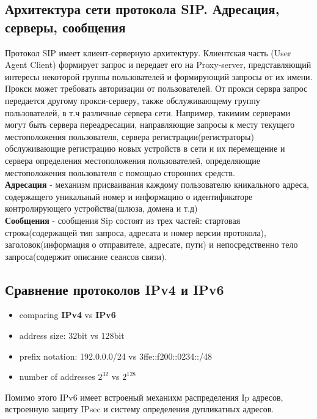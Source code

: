 \documentclass[unicode, 12pt, a4paper,oneside]{article}
\begin{document}
\begin{multicols}{2}
\subsection{Архитектура сети протокола SIP. Адресация, серверы, сообщения}
Протокол SIP имеет клиент-серверную архитектуру. Клиентская часть (User Agent Client) формирует запрос и передает его на Proxy-server, представляющий интересы некоторой группы пользователей и формирующий запросы от их имени. Прокси может требовать авторизации от пользователей. От прокси сервра запрос передается другому прокси-серверу, также обслуживающему группу пользователей, в т.ч различные сервера сети. Например, такимим серверами могут быть сервера переадресации, направляющие запросы к месту текущего местоположения пользователя, сервера регистрации(регистраторы) обслуживающие регистрацию новых устройств в сети и их перемещение и сервера определения местоположения пользователей, определяющие местоположения пользователя с помощью сторонних средств.\\
{\bf Адресация} - механизм присваивания каждому пользователю кникального адреса, содержащего уникальный номер и информацию о идентификаторе контролирующего устройства(шлюза, домена и т.д)\\
{\bf Сообщения} - сообщения Sip состоят из трех частей: стартовая строка(содержащей тип запроса, адресата и номер версии протокола), заголовок(информация о отправителе, адресате, пути) и непосредственно тело запроса(содержит описание сеансов связи).

\subsection{Сравнение протоколов IPv4 и IPv6}
\begin{itemize}
\item comparing {\bf IPv4} vs {\bf IPv6}
\item address size: 32bit vs 128bit
\item prefix notation: 192.0.0.0/24 vs 3ffe::f200::0234::/48
\item number of addresses $2^{32}$ vs $2^{128}$
\end{itemize}
Помимо этого IPv6 имеет встроеный механихм распределения Ip адресов, встроенную защиту IPsec и систему определения дупликатных адресов.


\end{multicols}
\end{document}
